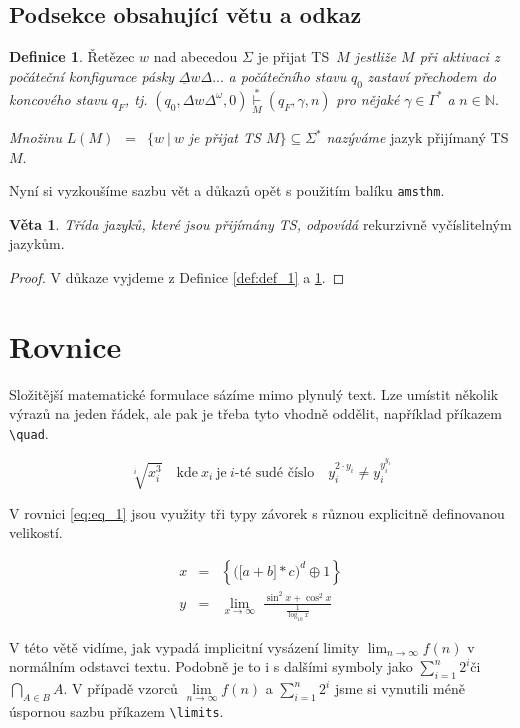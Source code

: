 \documentclass[a4paper, twocolumn, 11pt]{article}
\theoremstyle{definition}
\newtheorem{definition}{Definice}
\newtheorem{sentence}{Věta}
\begin{document}
\subsection{Podsekce obsahující větu a odkaz}
\setlength{\parskip}{0em}
\begin{definition} \label{def:def_2}
Řetězec $w$ nad abecedou $\Sigma$ je přijat TS~\textit{$M$ jestliže\- $M$ při aktivaci z počáteční konfigurace pásky}
$\underline{\Delta}w\Delta...$ \textit{a počátečního stavu} $q_0$ \textit{zastaví přechodem do koncového stavu} $q_F$\textit{, tj.} $(q_0, \Delta w \Delta^\omega, 0) \underset{M}{\overset{*}{\vdash}} (q_F,\gamma,n)$ \textit{pro nějaké} $\gamma \in \Gamma^*$ \textit{a} $n \in \mathbb{N}$.\par \setlength{\parindent}{1em}
\textit{Množinu} $L(M)$\ $=$\ $\{w\:|\:w$ \textit{je přijat TS $M$}$\} \subseteq \Sigma^*$ \textit{nazýváme} jazyk přijímaný TS $M$.\par
\end{definition}
\setlength{\parindent}{1em}
Nyní si vyzkoušíme sazbu vět a důkazů opět s použitím balíku \verb|amsthm|. \setlength{\parskip}{0em}
\begin{sentence}
\textit{Třída jazyků, které jsou přijímány TS, odpovídá} rekurzivně vyčíslitelným jazykům.
\end{sentence} \setlength{\parskip}{0em}
\begin{proof}
V důkaze vyjdeme z Definice \ref{def:def_1} a \ref{def:def_2}.
\end{proof}

\section{Rovnice}

Složitější matematické formulace sázíme mimo plynulý
text. Lze umístit několik výrazů na jeden řádek, ale pak je
třeba tyto vhodně oddělit, například příkazem \verb|\quad|.

$$\sqrt[i]{x_i^3} \quad\text{kde}\ x_i\ \text{je}\ i\text{-té sudé číslo}\quad y_i^{2 \cdot y_i} \neq y_i^{y_i^{y_i}}$$

V rovnici \eqref{eq:eq_1} jsou využity tři typy závorek s různou explicitně definovanou velikostí.
\setlength{\parskip}{0em}

\begin{eqnarray}
x & = & \left\{ \Big( \big[ a + b \big] * c\Big)^d \oplus 1 \right\} \label{eq:eq_1} \\ 
y & = & \underset{x \to \infty}{\lim}\;\frac{\sin^2{x} + \cos^2{x}}{\frac{1}{\log_{10} x}} \label{eq:eq_2}
\end{eqnarray}
\par \setlength{\parskip}{0.05em}
V této větě vidíme, jak vypadá implicitní vysázení limity $\lim_{n \to \infty} f(n)$ v normálním odstavci textu. Podobně je to i s dalšími symboly jako $\sum_{i=1}^n 2^i$\:či\:$\bigcap_{A \in B} A$. V případě vzorců $\lim\limits_{n \to \infty} f(n)$ a $\sum\limits_{i=1}^n 2^i$ jsme si vynutili méně úspornou sazbu příkazem \verb|\limits|.
\end{document}
